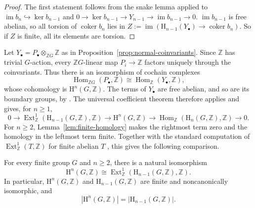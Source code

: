 \documentclass[11pt,a4paper]{amsart}
\numberwithin{equation}{section}
\DeclareMathOperator{\Ext}{Ext}
\DeclareMathOperator{\Hom}{Hom}
\DeclareMathOperator{\im}{im}
\newcommand{\HH}{\mathrm H}
\newcommand{\Z}{\mathbb Z}
\begin{document}
\begin{proof}
The first statement follows from the snake lemma applied to $\im b_n\hookrightarrow \ker b_{n-1}$ and $0\rightarrow \ker b_{n-1}\rightarrow Y_{n-1}\rightarrow \im b_{n-1}\rightarrow 0$.
$\im b_{n-1}$ is free abelian, so all torsion of $\operatorname{coker} b_n$ lies in  $Z:=\im(\HH_{n-1}(Y_\bullet)
\rightarrow\operatorname{coker}b_n)$. So if $Z$ is finite, all its elements are torsion. 

\end{proof}
Let $Y_\bullet=P_\bullet\otimes_{\Z G}\Z$ as in Proposition~\ref{prop:normal-coinvariants}. Since
$\Z$ has trivial $G$-action, every $\Z G$-linear map
$P_i\to\Z$ factors uniquely through the coinvariants. Thus
there is an isomorphism of cochain complexes
\[
 \Hom_{\Z G}(P_\bullet,\Z)
 \cong\Hom_\Z(Y_\bullet,\Z),
\]
whose cohomology is $\HH^n(G,\Z)$. The terms of $Y_\bullet$
are free abelian, and so are its boundary groups, by
\cite[Corollary~4.15(i), p.~163]{Rot}. The universal coefficient
theorem \cite[Theorem~7.59(i), \mbox{pp.~451--452}]{Rot}
therefore applies and gives, for $n\geq1$,
\[
 0\longrightarrow\Ext^1_\Z(\HH_{n-1}(G,\Z),\Z)
 \longrightarrow\HH^n(G,\Z)
 \longrightarrow\Hom_\Z(\HH_n(G,\Z),\Z)
 \longrightarrow0.
\]
For $n\geq2$, Lemma~\ref{lem:finite-homology} makes the
rightmost term zero and the homology in the leftmost term finite.
Together with the standard computation of $\Ext^1_\Z(T,\Z)$
for finite abelian $T$
\cite[Example~7.23(i)--(ii), p.~420]{Rot}, this gives the
following comparison.

\begin{proposition}\label{prop:integral-comparison}
For every finite group $G$ and $n\geq2$, there is a natural
isomorphism
\[
 \HH^n(G,\Z)\cong\Ext^1_\Z(\HH_{n-1}(G,\Z),\Z).
\]
In particular, $\HH^n(G,\Z)$ and $\HH_{n-1}(G,\Z)$ are
finite and noncanonically isomorphic, and
\[
 |\HH^n(G,\Z)|=|\HH_{n-1}(G,\Z)|.
\]
\end{proposition}
\end{document}
